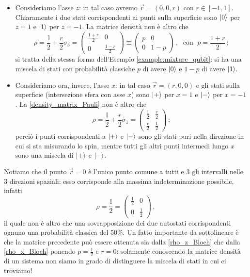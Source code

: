 \begin{itemize}
    \item Consideriamo l'asse $z$: in tal caso avremo $\vec{r} = (0, 0, r)$ con $r \in [-1, 1]$. Chiaramente i due stati corrispondenti ai punti sulla superficie sono $\ket{0}$ per $z=1$ e $\ket{1}$ per $z = -1$. La matrice densità non è altro che
    \begin{equation}\label{rho_z_Bloch}
        \rho = \frac{\mathbb{I}}{2} + \frac{r}{2} \sigma_3 = 
        \begin{pmatrix}
            \frac{1+r}{2} & 0 \\ 0 & \frac{1-r}{2}
        \end{pmatrix}
        \equiv
        \begin{pmatrix}
            p & 0 \\ 0 & 1-p
        \end{pmatrix} \, , \; \text{ con } \; p = \frac{1+r}{2} \, ;
    \end{equation}
    si tratta della stessa forma dell'Esempio \ref{example:mixture_qubit}: si ha una miscela di stati con probabilità classiche $p$ di avere $\ket{0}$ e $1-p$ di avere $\ket{1}$. 
    
    \item Consideriamo ora, invece, l'asse $x$: in tal caso $\vec{r} = (r, 0, 0)$ e gli stati sulla superficie (intersezione sfera con asse $x$) sono $\ket{+}$ per $x = 1$ e $\ket{-}$ per $x = -1$. La \eqref{density_matrix_Pauli} non è altro che
    \begin{equation}\label{rho_x_Bloch}
        \rho = \frac{\mathbb{I}}{2} + \frac{r}{2} \sigma_1 =
        \begin{pmatrix}
            \frac{1}{2} & \frac{r}{2} \\ \frac{r}{2} & \frac{1}{2}
        \end{pmatrix} \, ;
    \end{equation}
    perciò i punti corrispondenti a $\ket{+}$ e $\ket{-}$ sono gli stati puri nella direzione in cui si sta misurando lo spin, mentre tutti gli altri punti intermedi lungo $x$ sono una miscela di $\ket{+}$ e $\ket{-}$. 
\end{itemize}

\noindent Notiamo che il punto $\vec{r} = 0$ è l'unico punto comune a tutti e 3 gli intervalli nelle 3 direzioni spaziali: esso corrisponde alla massima indeterminazione possibile, infatti
\begin{equation*}
    \rho = \frac{\mathbb{I}}{2} = 
    \begin{pmatrix}
        \frac{1}{2} & 0 \\ 0 & \frac{1}{2}
    \end{pmatrix} \, ,
\end{equation*}
il quale non è altro che una sovrapposizione dei due autostati corrispondenti ognuno una probabilità classica del 50\%. Un fatto importante da sottolineare è che la matrice precedente può essere ottenuta sia dalla \eqref{rho_z_Bloch} che dalla \eqref{rho_x_Bloch} ponendo $p = \frac{1}{2}$ e $r = 0$: solamente conoscendo la matrice densità di un sistema non siamo in grado di distinguere la miscela di stati in cui ci troviamo!

